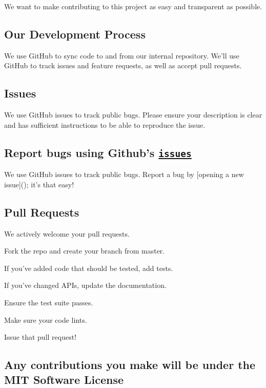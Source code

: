 We want to make contributing to this project as easy and transparent as possible.

\subsection*{Our Development Process}

We use Git\-Hub to sync code to and from our internal repository. We'll use Git\-Hub to track issues and feature requests, as well as accept pull requests.

\subsection*{Issues}

We use Git\-Hub issues to track public bugs. Please ensure your description is clear and has sufficient instructions to be able to reproduce the issue.

\subsection*{Report bugs using Github's \href{https://github.com/MRKonrad/tomato/issues}{\tt issues}}

We use Git\-Hub issues to track public bugs. Report a bug by \mbox{[}opening a new issue\mbox{]}(); it's that easy!

\subsection*{Pull Requests}

We actively welcome your pull requests.


\begin{DoxyEnumerate}
\item Fork the repo and create your branch from {\ttfamily master}.
\item If you've added code that should be tested, add tests.
\item If you've changed A\-P\-Is, update the documentation.
\item Ensure the test suite passes.
\item Make sure your code lints.
\item Issue that pull request!
\end{DoxyEnumerate}

\subsection*{Any contributions you make will be under the M\-I\-T Software License}

